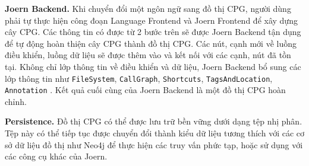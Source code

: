 \textbf{Joern Backend.} Khi chuyển đổi một ngôn ngữ sang đồ thị CPG, người dùng phải tự thực hiện công đoạn Language Frontend và Joern Frontend để xây dựng cây CPG.
Các thông tin có được từ 2 bước trên sẽ được Joern Backend tận dụng để tự động hoàn thiện cây CPG thành đồ thị CPG.
Các nút, cạnh mới về luồng điều khiển, luồng dữ liệu sẽ được thêm vào và kết nối với các cạnh, nút đã tồn tại.
Không chỉ lớp thông tin về điều khiển và dữ liệu, Joern Backend bổ sung các lớp thông tin như  \texttt{FileSystem}, \texttt{CallGraph}, \texttt{Shortcuts}, \texttt{TagsAndLocation}, \texttt{Annotation} \cite{joernCodeProperty}.
Kết quả cuối cùng của Joern Backend là một đồ thị CPG hoàn chỉnh.

\textbf{Persistence.} Đồ thị CPG có thể được lưu trữ bền vững dưới dạng tệp nhị phân.
Tệp này có thể tiếp tục được chuyển đổi thành kiểu dữ liệu tương thích với các cơ sở dữ liệu đồ thị như Neo4j để thực hiện các truy vấn phức tạp, hoặc sử dụng với các công cụ khác của Joern.
